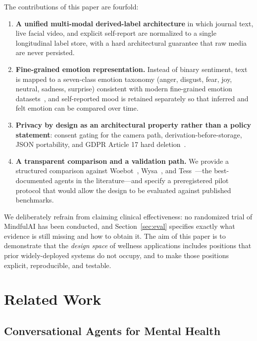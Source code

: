 \documentclass[11pt,a4paper]{article}
\newcommand{\system}{MindfulAI}
\begin{document}
The contributions of this paper are fourfold:
\begin{enumerate}[leftmargin=2em, itemsep=2pt]
    \item \textbf{A unified multi-modal derived-label architecture} in which journal text, live facial video, and explicit self-report are normalized to a single longitudinal label store, with a hard architectural guarantee that raw media are never persisted.
    \item \textbf{Fine-grained emotion representation.} Instead of binary sentiment, text is mapped to a seven-class emotion taxonomy (anger, disgust, fear, joy, neutral, sadness, surprise) consistent with modern fine-grained emotion datasets~\cite{demszky2020,hartmann2023}, and self-reported mood is retained separately so that inferred and felt emotion can be compared over time.
    \item \textbf{Privacy by design as an architectural property rather than a policy statement}: consent gating for the camera path, derivation-before-storage, JSON portability, and GDPR Article 17 hard deletion~\cite{gdpr2016}.
    \item \textbf{A transparent comparison and a validation path.} We provide a structured comparison against Woebot~\cite{fitzpatrick2017}, Wysa~\cite{inkster2018}, and Tess~\cite{fulmer2018}---the best-documented agents in the literature---and specify a preregistered pilot protocol that would allow the design to be evaluated against published benchmarks.
\end{enumerate}

We deliberately refrain from claiming clinical effectiveness: no randomized trial of \system{} has been conducted, and Section~\ref{sec:eval} specifies exactly what evidence is still missing and how to obtain it. The aim of this paper is to demonstrate that the \emph{design space} of wellness applications includes positions that prior widely-deployed systems do not occupy, and to make those positions explicit, reproducible, and testable.

\section{Related Work}\label{sec:related}

\subsection{Conversational Agents for Mental Health}\label{sec:agents}
\end{document}
